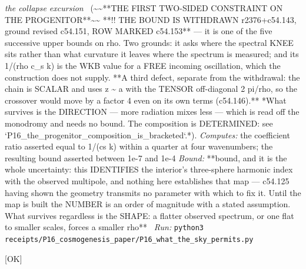 \begin{description}
\textit{the collapse excursion} \ (\textasciitilde{}\textasciitilde{}**THE FIRST TWO-SIDED CONSTRAINT ON THE PROGENITOR**\textasciitilde{}\textasciitilde{} **!! THE BOUND IS WITHDRAWN r2376+c54.143, ground revised c54.151, ROW MARKED c54.153** --- it is one of the five successive upper bounds on rho. Two grounds: it asks where the spectral KNEE sits rather than what curvature it leaves where the spectrum is measured; and its 1/(rho c\_s k) is the WKB value for a FREE incoming oscillation, which the construction does not supply. **A third defect, separate from the withdrawal: the chain is SCALAR and uses z \textasciitilde{} a with the TENSOR off-diagonal 2 pi/rho, so the crossover would move by a factor 4 even on its own terms (c54.146).** *What survives is the DIRECTION --- more radiation mixes less --- which is read off the monodromy and needs no bound. The composition is DETERMINED: see `P16\_the\_progenitor\_composition\_is\_bracketed`.*). 
\emph{Computes:} the coefficient ratio asserted equal to 1/(cs k) within a quarter at four wavenumbers; the resulting bound asserted between 1e-7 and 1e-4
 \emph{Bound:} **bound, and it is the whole uncertainty: this IDENTIFIES the interior's three-sphere harmonic index with the observed multipole, and nothing here establishes that map --- c54.125 having shown the geometry transmits no parameter with which to fix it. Until the map is built the NUMBER is an order of magnitude with a stated assumption. What survives regardless is the SHAPE: a flatter observed spectrum, or one flat to smaller scales, forces a smaller rho**
\ \emph{Run:} \texttt{python3 receipts/P16\_cosmogenesis\_paper/P16\_what\_the\_sky\_permits.py}
\item[\rcptlabel{P16_the_interior_to_observed_mode_map}{P16R18}\textbf{P16R18}\quad\texttt{P16\_the\_interior\_to\_observed\_mode\_map}]\hfill\textsf{[OK]}\\

\end{description}
